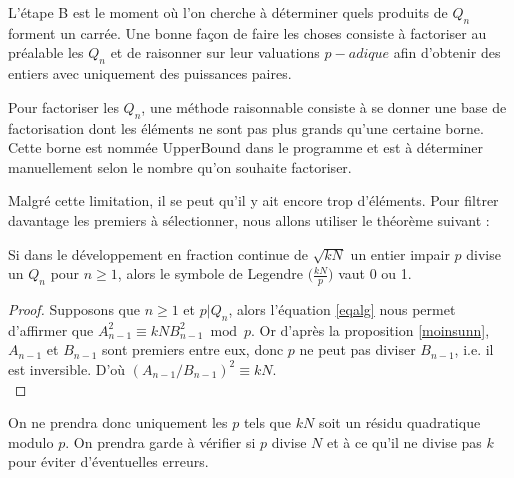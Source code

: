 \documentclass[a4paper]{article} %
\numberwithin{equation}{section}
\begin{document}
L'étape B est le moment où l'on cherche à déterminer quels produits de $Q_n$ forment un carrée. Une bonne façon de faire les choses consiste à factoriser au préalable les $Q_n$ et de raisonner sur leur valuations $p-adique$ afin d'obtenir des entiers avec uniquement des puissances paires.\\\par
Pour factoriser les $Q_n$, une méthode raisonnable consiste à se donner une base de factorisation dont les éléments ne sont pas plus grands qu'une certaine borne. Cette borne est nommée UpperBound dans le programme et est à déterminer manuellement selon le nombre qu'on souhaite factoriser.\par
Malgré cette limitation, il se peut qu'il y ait encore trop d'éléments. Pour filtrer davantage les premiers à sélectionner, nous allons utiliser le théorème suivant :
\begin{thm}
Si dans le développement en fraction continue de $\sqrt{kN}$ un entier impair $p$ divise un $Q_n$ pour $n\geq1$, alors le symbole de Legendre $\big(\tfrac{kN}{p}\big)$ vaut 0 ou 1.
\end{thm}
\begin{proof}
Supposons que $n\geq1$ et $p|Q_n$, alors l'équation \ref{eqalg} nous permet d'affirmer que $A_{n-1}^2 \equiv kNB_{n-1}^2 \bmod p$. Or d'après la proposition \ref{moinsunn}, $A_{n-1}$ et $B_{n-1}$ sont premiers entre eux, donc $p$ ne peut pas diviser $B_{n-1}$, i.e. il est inversible. D'où $(A_{n-1}/B_{n-1})^2 \equiv kN$.\\
\end{proof}
On ne prendra donc uniquement les $p$ tels que $kN$ soit un résidu quadratique modulo $p$. On prendra garde à vérifier si $p$ divise $N$ et à ce qu'il ne divise pas $k$ pour éviter d'éventuelles erreurs.\\\par
\end{document}
